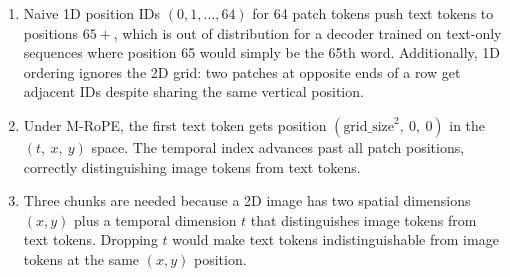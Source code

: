 \documentclass[11pt]{article}
\begin{document}
\begin{enumerate}

\item Naive 1D position IDs $(0, 1, \ldots, 64)$ for 64 patch tokens push text
tokens to positions $65+$, which is out of distribution for a decoder trained
on text-only sequences where position 65 would simply be the 65th word.
Additionally, 1D ordering ignores the 2D grid: two patches at opposite ends
of a row get adjacent IDs despite sharing the same vertical position.

\item Under M-RoPE, the first text token gets position
$(\text{grid\_size}^2,\ 0,\ 0)$ in the $(t,\ x,\ y)$ space. The temporal
index advances past all patch positions, correctly distinguishing image tokens
from text tokens.

\item Three chunks are needed because a 2D image has two spatial dimensions
$(x, y)$ plus a temporal dimension $t$ that distinguishes image tokens from
text tokens. Dropping $t$ would make text tokens indistinguishable from image
tokens at the same $(x, y)$ position.

\end{enumerate}
\end{document}
